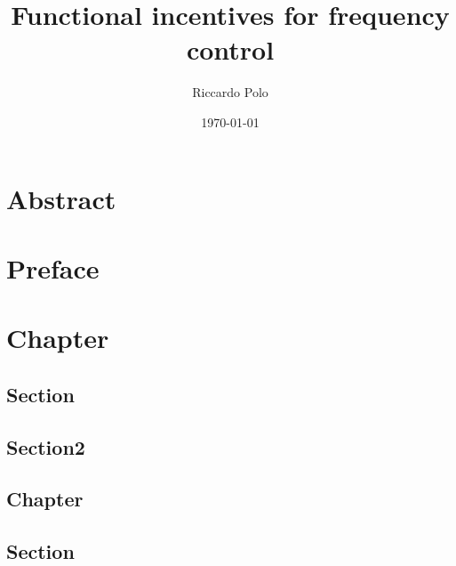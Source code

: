 \documentclass[a4paper,11pt,twoside]{book}
\title{Functional incentives for frequency control}
\author{Riccardo Polo}
\date{\today}
\begin{document}
\hyphenation{}

\maketitle

\chapter{Abstract} \label{abstract}

\chapter{Preface}

\cleardoublepage
\tableofcontents
\cleardoublepage
{}
\listoffigures
\cleardoublepage
{}
\listoftables					
\cleardoublepage
\mainmatter

\chapter{Chapter}

\section{Section} \label{sec:Section1}


\section{Section2} \label{sec:Section2}

\cleardoublepage
\printbibliography

\begin{appendix}
\chapter{Chapter}\label{app:Chapter}

\section{Section}\label{appsec:Section}
\end{appendix}
        									
\end{document}
